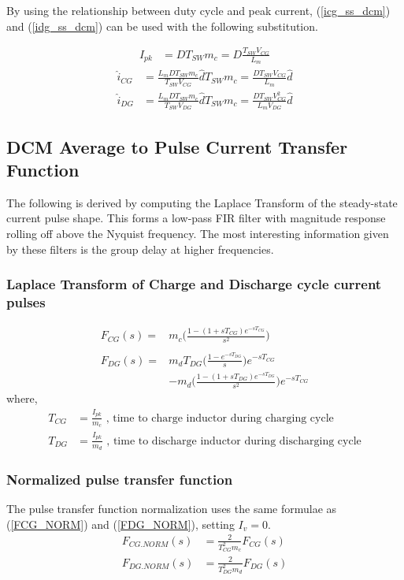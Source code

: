 \documentclass{scrartcl}
\begin{document}
	By using the relationship between duty cycle and peak current, (\ref{icg_ss_dcm}) and (\ref{idg_ss_dcm}) can be used with the following substitution.
	
	\begin{align}
		I_{pk} &= D T_{SW} m_c = D \frac{T_{SW} V_{CG}}{L_m}
	\end{align}
	\begin{align}
	\hat i_{CG} &= \frac{L_m D T_{SW} m_c}{T_{SW}V_{CG}}  \hat d T_{SW} m_c = \frac{ D T_{SW} V_{CG}}{L_m} \hat d \\
	\hat i_{DG} &= \frac{L_m D T_{SW} m_c}{T_{SW}V_{DG}} \hat d T_{SW} m_c = \frac{ D T_{SW} V_{CG}^2}{L_m V_{DG}} \hat d
	\end{align}
	
\subsection{DCM Average to Pulse Current Transfer Function}	
The following is derived by computing the Laplace Transform of the steady-state current pulse shape.  This forms a low-pass FIR filter with magnitude response rolling off above the Nyquist frequency.  The most interesting information given by these filters is the group delay at higher frequencies.

\subsubsection{Laplace Transform of Charge and Discharge cycle current pulses}	

\begin{align}
F_{CG}(s) =&   m_c\bigg( \frac{1 - (1 + sT_{CG})e^{-sT_{CG}}}{s^2} \bigg)
\label{icg_IR_laplace_dcm} \\
\nonumber\\
F_{DG}(s) =&  m_d T_{DG} \bigg( \frac{1 - e^{-sT_{DG}}}{s} \bigg)  e^{-sT_{CG}}\nonumber\\
&- m_d \bigg( \frac{1 - (1 + sT_{DG})e^{-sT_{DG}}}{s^2} \bigg)  e^{-sT_{CG}}
\label{idg_IR_laplace_dcm}
\end{align}
where,
\begin{align}
	T_{CG} &= \frac{I_{pk}} {m_c} \text{ , time to charge inductor during charging cycle}\\
	T_{DG} &= \frac{I_{pk}} {m_d} \text{ , time to discharge inductor during discharging cycle}
\end{align}
	
		\subsubsection{Normalized pulse transfer function}
		The pulse transfer function normalization uses the same formulae as (\ref{FCG_NORM}) and (\ref{FDG_NORM}), setting $I_v=0$.
		\begin{align}
		F_{CG.NORM}(s) &= \frac{2}{T_{CG}^2m_c } F_{CG}(s)\label{FCG_NORM_DCM} \\
		F_{DG.NORM}(s) &= \frac{2}{T_{DG}^2m_d }F_{DG}(s) \label{FCG_NORM_DCM}
		\end{align}
	
\end{document}
